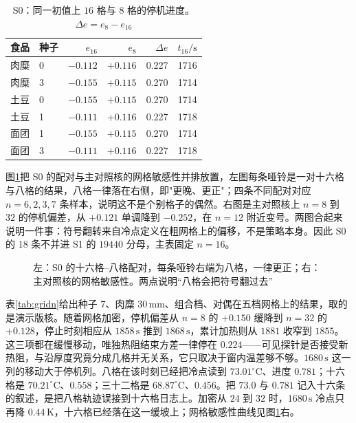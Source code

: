 \begin{table}[htbp]
\centering
\caption{S0：同一初值上 \(16\) 格与 \(8\) 格的停机进度。\(\Delta e=e_8-e_{16}\)}
\label{tab:s0}
\setlength{\tabcolsep}{2.4pt}
{\footnotesize
\begin{tabular}{llrrrr}
\toprule
食品 & 种子 & \(e_{16}\) & \(e_8\) & \(\Delta e\) & \(t_{16}/\mathrm{s}\) \\
\midrule
肉糜 & 0 & \(-0.112\) & \(+0.116\) & 0.227 & 1716 \\
肉糜 & 3 & \(-0.155\) & \(+0.115\) & 0.270 & 1714 \\
土豆 & 0 & \(-0.155\) & \(+0.115\) & 0.270 & 1714 \\
土豆 & 1 & \(-0.111\) & \(+0.116\) & 0.227 & 1718 \\
面团 & 1 & \(-0.155\) & \(+0.115\) & 0.270 & 1714 \\
面团 & 3 & \(-0.111\) & \(+0.116\) & 0.227 & 1718 \\
\bottomrule
\end{tabular}}
\end{table}

图\ref{fig:gridmerge}{}把 S0 的配对与主对照核的网格敏感性并排放置，左图每条哑铃是一对十六格与八格的结果，八格一律落在右侧，即"更晚、更正"；四条不同配对对应 \(n=6,2,3,7\) 条样本，说明这不是个别格子的偶然。右图是主对照核上 \(n=8\) 到 \(32\) 的停机偏差，从 \(+0.121\) 单调降到 \(-0.252\)，在 \(n=12\) 附近变号。两图合起来说明一件事：符号翻转来自冷点定义在粗网格上的偏移，不是策略本身。因此 S0 的 \(18\) 条不并进 S1 的 \(19440\) 分母，主表固定 \(n=16\)。

\begin{figure}[t]
\centering
{}
\caption{左：S0 的十六格--八格配对，每条哑铃右端为八格，一律更正；右：主对照核的网格敏感性。两点说明“八格会把符号翻过去”}
\label{fig:gridmerge}
\end{figure}

表\ref{tab:gridn}{}给出种子 7、肉糜 \(30\,\mathrm{mm}\)、组合档、对偶在五档网格上的结果，取的是演示版核。随着网格加密，停机偏差从 \(n=8\) 的 \(+0.150\) 缓降到 \(n=32\) 的 \(+0.128\)，停止时刻相应从 \(1858\,\mathrm{s}\) 推到 \(1868\,\mathrm{s}\)，累计加热则从 \(1881\) 收窄到 \(1855\)。这三项都在缓慢移动，唯独热阻结束方差一律停在 \(0.224\)——可见探针是否接受新热阻，与沿厚度究竟分成几格并无关系，它只取决于窗内温差够不够。\(1680\,\mathrm{s}\) 这一列的移动大于停机列。八格在该时刻已经把冷点读到 \(73.01^\circ\mathrm{C}\)、进度 \(0.781\)；十六格是 \(70.21^\circ\mathrm{C}\)、\(0.558\)；三十二格是 \(68.87^\circ\mathrm{C}\)、\(0.456\)。把 \(73.0\) 与 \(0.781\) 记入十六条的叙述，是把八格轨迹误接到十六格日志上。加密从 \(24\) 到 \(32\) 时，\(1680\,\mathrm{s}\) 冷点只再降 \(0.44\,\mathrm{K}\)，十六格已经落在这一缓坡上；网格敏感性曲线见图\ref{fig:gridmerge}{}右。


